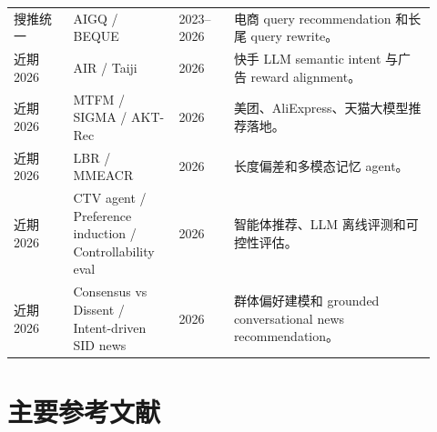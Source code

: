\documentclass[UTF8,fontset=fandol,11pt]{ctexart}
\begin{document}
\begin{longtable}{@{}p{0.13\linewidth}p{0.23\linewidth}p{0.12\linewidth}p{0.44\linewidth}@{}}
搜推统一 & AIGQ / BEQUE & 2023--2026 & 电商 query recommendation 和长尾 query rewrite。\\
近期 2026 & AIR / Taiji & 2026 & 快手 LLM semantic intent 与广告 reward alignment。\\
近期 2026 & MTFM / SIGMA / AKT-Rec & 2026 & 美团、AliExpress、天猫大模型推荐落地。\\
近期 2026 & LBR / MMEACR & 2026 & 长度偏差和多模态记忆 agent。\\
近期 2026 & CTV agent / Preference induction / Controllability eval & 2026 & 智能体推荐、LLM 离线评测和可控性评估。\\
近期 2026 & Consensus vs Dissent / Intent-driven SID news & 2026 & 群体偏好建模和 grounded conversational news recommendation。\\
\bottomrule
\end{longtable}
\normalsize

\section{主要参考文献}
\end{document}
